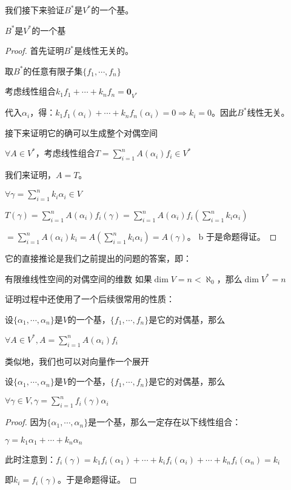 \documentclass[12pt, a4paper, oneside, UTF8]{ctexbook}
\begin{document}
			我们接下来验证$B^*$是$V^*$的一个基。
			\begin{proposition}
				$B^*$是$V^*$的一个基
			\end{proposition}
			\begin{proof}
				首先证明$B^*$是线性无关的。

				取$B^*$的任意有限子集$\{f_1,\cdots,f_n\}$

				考虑线性组合$k_1 f_1 + \cdots+k_n f_n = \mathbf{0}_{V^*}$

				代入$\alpha_i$，得：$k_1 f_1(\alpha_i) + \cdots+k_n f_n(\alpha_i) = 0 \Rightarrow k_i = 0$。因此$B^*$线性无关。

				接下来证明它的确可以生成整个对偶空间

				$\forall A \in V^*$，考虑线性组合$T = \sum\limits_{i=1}^{n} A(\alpha_i) f_i \in V^*$

				我们来证明，$A=T$。

				$\forall \gamma = \sum\limits_{i=1}^{n} k_i \alpha_i \in V$

				$T(\gamma ) = \sum\limits_{i=1}^{n} A(\alpha_i) f_i(\gamma )=\sum\limits_{i=1}^{n} A(\alpha_i) f_i(\sum\limits_{i=1}^{n} k_i \alpha_i)$

				$= \sum\limits_{i=1}^{n} A(\alpha_i) k_i= A(\sum\limits_{i=1}^{n} k_i \alpha_i)=A(\gamma )$。
b    
				于是命题得证。
			\end{proof}
			它的直接推论是我们之前提出的问题的答案，即：
			\begin{corollary}{有限维线性空间的对偶空间的维数}{}
				如果$\dim V = n < \aleph_0$，那么$\dim V^* = n$
			\end{corollary}
			证明过程中还使用了一个后续很常用的性质：
			\begin{proposition}
				设$\{\alpha_1,\cdots,\alpha_n\}$是$V$的一个基，$\{f_1,\cdots,f_n\}$是它的对偶基，那么

				$\forall A \in V^*,A=\sum\limits_{i=1}^{n} A(\alpha_i) f_i$
			\end{proposition}
			类似地，我们也可以对向量作一个展开
			\begin{proposition}
				设$\{\alpha_1,\cdots,\alpha_n\}$是$V$的一个基，$\{f_1,\cdots,f_n\}$是它的对偶基，那么

				$\forall \gamma  \in V,\gamma  =\sum\limits_{i=1}^{n} f_i(\gamma )\alpha_i$
			\end{proposition}
			\begin{proof}
				因为$\{\alpha_1,\cdots,\alpha_n\}$是一个基，那么一定存在以下线性组合：

				$\gamma =k_1\alpha_1+\cdots+k_n\alpha_n$

				此时注意到：$f_i(\gamma )=k_1f_i(\alpha_1)+\cdots+k_i f_i(\alpha_i)+\cdots+k_n f_i(\alpha_n)=k_i$

				即$k_i = f_i(\gamma )$。于是命题得证。
			\end{proof}
\end{document}
